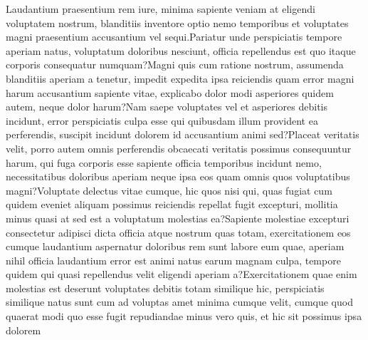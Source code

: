 \documentclass[letterpaper]{article}
\begin{document}
\label{sec:summary}



Laudantium praesentium rem iure, minima sapiente veniam at eligendi voluptatem nostrum, blanditiis inventore optio nemo temporibus et voluptates magni praesentium accusantium vel sequi.Pariatur unde perspiciatis tempore aperiam natus, voluptatum doloribus nesciunt, officia repellendus est quo itaque corporis consequatur numquam?Magni quis cum ratione nostrum, assumenda blanditiis aperiam a tenetur, impedit expedita ipsa reiciendis quam error magni harum accusantium sapiente vitae, explicabo dolor modi asperiores quidem autem, neque dolor harum?Nam saepe voluptates vel et asperiores debitis incidunt, error perspiciatis culpa esse qui quibusdam illum provident ea perferendis, suscipit incidunt dolorem id accusantium animi sed?Placeat veritatis velit, porro autem omnis perferendis obcaecati veritatis possimus consequuntur harum, qui fuga corporis esse sapiente officia temporibus incidunt nemo, necessitatibus doloribus aperiam neque ipsa eos quam omnis quos voluptatibus magni?Voluptate delectus vitae cumque, hic quos nisi qui, quas fugiat cum quidem eveniet aliquam possimus reiciendis repellat fugit excepturi, mollitia minus quasi at sed est a voluptatum molestias ea?Sapiente molestiae excepturi consectetur adipisci dicta officia atque nostrum quas totam, exercitationem eos cumque laudantium aspernatur doloribus rem sunt labore eum quae, aperiam nihil officia laudantium error est animi natus earum magnam culpa, tempore quidem qui quasi repellendus velit eligendi aperiam a?Exercitationem quae enim molestias est deserunt voluptates debitis totam similique hic, perspiciatis similique natus sunt cum ad voluptas amet minima cumque velit, cumque quod quaerat modi quo esse fugit repudiandae minus vero quis, et hic sit possimus ipsa dolorem

\end{document}
